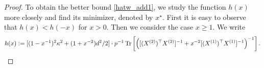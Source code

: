 \begin{proof}
To obtain the better bound \eqref{hatw_add1}, we study the function $h(x)$ more closely and find its minimizer, denoted by $x^\star$.
First it is easy to observe that $h(x)< h(-x)$ for $x> 0$.
Then we consider the case $x\ge 1$. We write
\begin{align*}
h(x):= [(1-x^{-1})^2\kappa^2 + (1+x^{-2})d^2/2] \cdot p^{-1} \tr\left[\left([(X^{(2)})^\top X^{(2)}]^{-1} + x^{-2} [(X^{(1)})^\top X^{(1)}]^{-1}\right)^{-1}\right].

\end{align*}
\end{proof}
